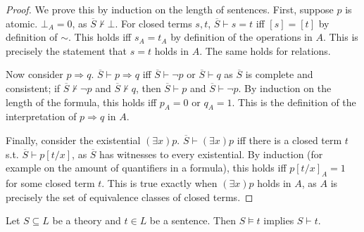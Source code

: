\begin{proof}
    We prove this by induction on the length of sentences.
    First, suppose $p$ is atomic.
    $\bot_A = 0$, as $\overline S \not\vdash \bot$.
    For closed terms $s, t$, $\overline S \vdash s = t$ iff $[s] = [t]$ by definition of $\sim$.
    This holds iff $s_A = t_A$ by definition of the operations in $A$.
    This is precisely the statement that $s = t$ holds in $A$.
    The same holds for relations.

    Now consider $p \Rightarrow q$.
    $\overline S \vdash p \Rightarrow q$ iff $\overline S \vdash \neg p$ or $\overline S \vdash q$ as $\overline S$ is complete and consistent; if $\overline S \not\vdash \neg p$ and $\overline S \not\vdash q$, then $\overline S \vdash p$ and $\overline S \vdash \neg p$.
    By induction on the length of the formula, this holds iff $p_A = 0$ or $q_A = 1$.
    This is the definition of the interpretation of $p \Rightarrow q$ in $A$.

    Finally, consider the existential $(\exists x)p$.
    $\overline S \vdash (\exists x)p$ iff there is a closed term $t$ s.t. $\overline S \vdash p[t/x]$, as $\overline S$ has witnesses to every existential.
    By induction (for example on the amount of quantifiers in a formula), this holds iff $p[t/x]_A = 1$ for some closed term $t$.
    This is true exactly when $(\exists x)p$ holds in $A$, as $A$ is precisely the set of equivalence classes of closed terms.
\end{proof}
\begin{corollary}[adequacy]
    Let $S \subseteq L$ be a theory and $t \in L$ be a sentence.
    Then $S \models t$ implies $S \vdash t$.
\end{corollary}

